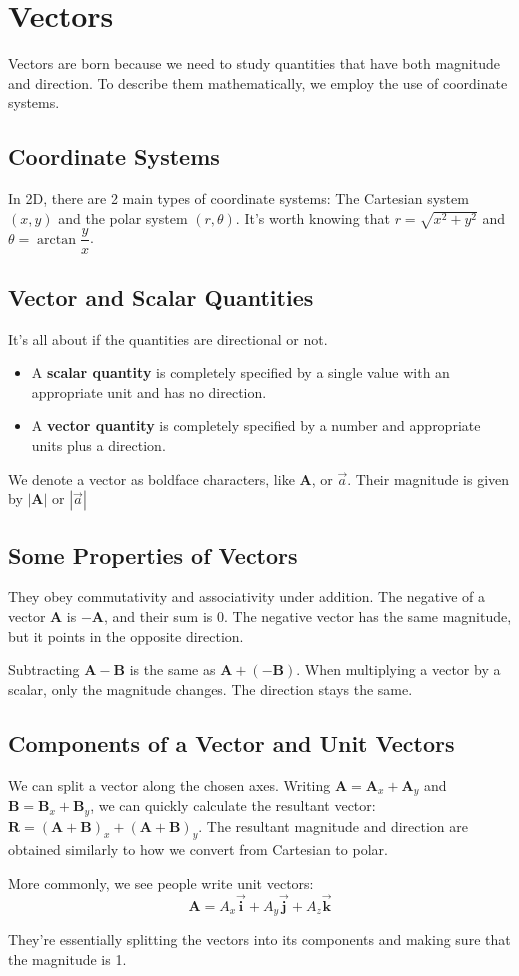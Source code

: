 \documentclass[12pt]{article}
\begin{document}
\section{Vectors}
Vectors are born because we need to study quantities that have both magnitude and direction. To describe them mathematically, we employ the use of coordinate systems.
\subsection*{Coordinate Systems}
In 2D, there are 2 main types of coordinate systems: The Cartesian system $(x,y)$ and the polar system $(r,\theta)$. It's worth knowing that $r = \sqrt{x^2 + y^2}$ and $\theta = \arctan{\dfrac{y}{x}}$.
\subsection*{Vector and Scalar Quantities}
It's all about if the quantities are directional or not.
\begin{concept}
\begin{itemize}
    \item A \textbf{scalar quantity} is completely specified by a single value with an appropriate unit and has no direction.
    \item A \textbf{vector quantity} is completely specified by a number and appropriate units plus a direction.
\end{itemize}
\end{concept}
\par We denote a vector as boldface characters, like $\mathbf{A}$, or $\vec{a}$. Their magnitude is given by $|\mathbf{A}|$ or $|\vec{a}|$
\subsection*{Some Properties of Vectors}
They obey commutativity and associativity under addition. The negative of a vector $\mathbf{A}$ is $\mathbf{-A}$, and their sum is 0. The negative vector has the same magnitude, but it points in the opposite direction.
\par Subtracting $\mathbf{A - B}$ is the same as $\mathbf{A + (-B)}$. When multiplying a vector by a scalar, only the magnitude changes. The direction stays the same.
\subsection*{Components of a Vector and Unit Vectors}
We can split a vector along the chosen axes. Writing $\mathbf{A} = \mathbf{A}_x + \mathbf{A}_y$ and $\mathbf{B} = \mathbf{B}_x + \mathbf{B}_y$, we can quickly calculate the resultant vector: $\mathbf{R} = (\mathbf{A+B})_x + (\mathbf{A+B})_y$. The resultant magnitude and direction are obtained similarly to how we convert from Cartesian to polar. 
\par More commonly, we see people write unit vectors: 
\begin{equation*}
    \mathbf{A} = A_x\vec{\mathbf{i}} + A_y\vec{\mathbf{j}} + A_z \vec{\mathbf{k}}
\end{equation*}
\par They're essentially splitting the vectors into its components and making sure that the magnitude is 1.
\end{document}
